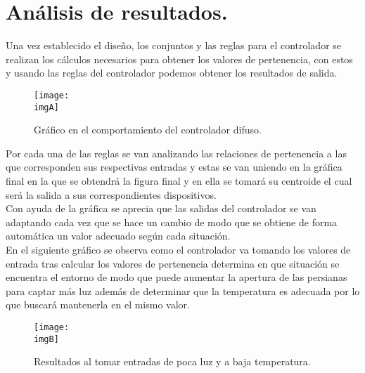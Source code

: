 \documentclass[a4paper, 12pt]{article}
\newcommand{\imgA}{img/diag1.png}
\newcommand{\imgB}{img/diag2.png}
\begin{document}
    \section{Análisis de resultados.}
	Una vez establecido el diseño, los conjuntos y las reglas para el controlador se realizan los cálculos necesarios para obtener los valores de pertenencia, con estos y usando las reglas del controlador podemos obtener los resultados de salida.
	\begin{figure}[!h]
		\centering
		\texttt{[image: \\imgA]}
		\caption{Gráfico en el comportamiento del controlador difuso.}
	\end{figure}
	Por cada una de las reglas se van analizando las relaciones de pertenencia a las que corresponden sus respectivas entradas y estas se van uniendo en la gráfica final en la que se obtendrá la figura final y en ella se tomará su centroide el cual será la salida a sus correspondientes dispositivos.\newline \\
	Con ayuda de la gráfica se aprecia que las salidas del controlador se van adaptando cada vez que se hace un cambio de modo que se obtiene de forma automática un valor adecuado según cada situación.\newline \\
	En el siguiente gráfico se observa como el controlador va tomando los valores de entrada tras calcular los valores de pertenencia determina en que situación se encuentra el entorno de modo que puede aumentar la apertura de las persianas para captar más luz además de determinar que la temperatura es adecuada por lo que buscará mantenerla en el mismo valor.
	\begin{figure}[!h]
		\centering
		\texttt{[image: \\imgB]}
		\caption{Resultados al tomar entradas de poca luz y a baja temperatura.}
	\end{figure}
    
\end{document}
